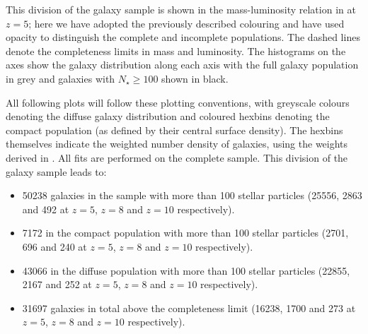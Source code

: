 This division of the galaxy sample is shown in the mass-luminosity relation in  at $z=5$; here we have adopted the previously described colouring and have used opacity to distinguish the complete and incomplete populations. The dashed lines denote the completeness limits in mass and luminosity. The histograms on the axes show the galaxy distribution along each axis with the full galaxy population in grey and galaxies with $N_\star\geq100$ shown in black. 

All following plots will follow these plotting conventions, with greyscale colours denoting the diffuse galaxy distribution and coloured hexbins denoting the compact population (as defined by their central surface density). The hexbins themselves indicate the weighted number density of galaxies, using the weights derived in \cite{Lovell2021}. All fits are performed on the complete sample. This division of the galaxy sample leads to:
\begin{itemize}
    \item 50238 galaxies in the sample with more than 100 stellar particles (25556, 2863 and 492 at $z=5$, $z=8$ and $z=10$ respectively).
    \item 7172 in the compact population with more than 100 stellar particles (2701, 696 and 240 at $z=5$, $z=8$ and $z=10$ respectively).
    \item 43066 in the diffuse population with more than 100 stellar particles (22855, 2167 and 252 at $z=5$, $z=8$ and $z=10$ respectively).
    \item 31697 galaxies in total above the completeness limit (16238, 1700 and 273 at $z=5$, $z=8$ and $z=10$ respectively).
\end{itemize} 





